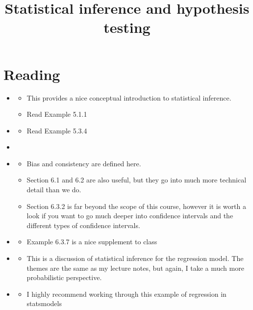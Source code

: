 


\title{Statistical inference and hypothesis testing}

\maketitle


\section{Reading}

\begin{itemize}
\item \cite[Section 5.1]{tabak}
\begin{itemize}
\item This provides a nice conceptual introduction to statistical inference. 
\item Read Example 5.1.1
\end{itemize} 
\item \cite[Section 5.3]{tabak}
\begin{itemize}
\item Read Example 5.3.4
\end{itemize}
\item \cite[Section 4.4.2]{tabak}
\item \cite[Section 6.3.1]{tabak}
\begin{itemize}
\item Bias and consistency are defined here. 
\item Section 6.1 and 6.2 are also useful, but they go into much more technical detail than we do. 
\item Section 6.3.2 is far beyond the scope of this course, however it is worth a look if you want to go much deeper into confidence intervals and the different types of confidence intervals. 
\end{itemize}
\item \cite[Section 6.3.1]{tabak}
\begin{itemize}
\item Example 6.3.7 is a nice supplement to class
\end{itemize}
\item \cite[Section 3.1.2]{islp}
\begin{itemize}
\item This is a discussion of statistical inference for the regression model. The themes are the same as my lecture notes, but again, I take a much more probabilistic perspective. 
\end{itemize}
\item \cite[Section 3.6.1 and 3.6.2]{islp}
\begin{itemize}
\item I highly recommend working through this example of regression in statsmodels
\end{itemize}
\end{itemize}




